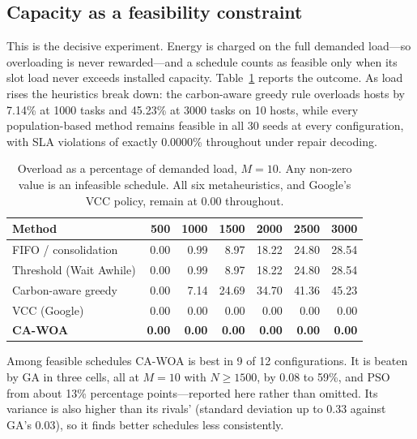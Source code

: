 \documentclass[12pt,a4paper]{article}
\providecommand{\DIFaddtex}[1]{{\protect\color{blue} \sf #1}} %
\providecommand{\DIFdeltex}[1]{{\protect\color{red} \scriptsize #1}} %
\providecommand{\DIFaddbegin}{} %
\providecommand{\DIFaddend}{} %
\providecommand{\DIFdelbegin}{} %
\providecommand{\DIFdelend}{} %
\providecommand{\DIFadd}[1]{\texorpdfstring{\DIFaddtex{#1}}{#1}} %
\providecommand{\DIFdel}[1]{\texorpdfstring{\DIFdeltex{#1}}{}} %
\providecommand{\DIFscaledelfig}{0.5}
\newlength{\DIFdelgraphicswidth} %
\newlength{\DIFdelgraphicsheight} %
\providecommand{\DIFaddincludegraphics}[2][]{{\color{blue}\fbox{\DIFOincludegraphics[#1]{#2}}}} %
\providecommand{\DIFdelincludegraphics}[2][]{%
\sbox{\DIFdelgraphicsbox}{\DIFOincludegraphics[#1]{#2}}%
\settoboxwidth{\DIFdelgraphicswidth}{\DIFdelgraphicsbox} %
\settoboxtotalheight{\DIFdelgraphicsheight}{\DIFdelgraphicsbox} %
\scalebox{\DIFscaledelfig}{%
\parbox[b]{\DIFdelgraphicswidth}{\usebox{\DIFdelgraphicsbox}\\[-\baselineskip] \rule{\DIFdelgraphicswidth}{0em}}\llap{\resizebox{\DIFdelgraphicswidth}{\DIFdelgraphicsheight}{%
\setlength{\unitlength}{\DIFdelgraphicswidth}%
\begin{picture}(1,1)%
\thicklines\linethickness{2pt} %
{\color[rgb]{1,0,0}\put(0,0){\framebox(1,1){}}}%
{\color[rgb]{1,0,0}\put(0,0){\line( 1,1){1}}}%
{\color[rgb]{1,0,0}\put(0,1){\line(1,-1){1}}}%
\end{picture}%
}\hspace*{3pt}}} %
} %
\DeclareRobustCommand{\DIFaddbegin}{\DIFOaddbegin \let\includegraphics\DIFaddincludegraphics} %
\DeclareRobustCommand{\DIFaddend}{\DIFOaddend \let\includegraphics\DIFOincludegraphics} %
\DeclareRobustCommand{\DIFdelbegin}{\DIFOdelbegin \let\includegraphics\DIFdelincludegraphics} %
\DeclareRobustCommand{\DIFdelend}{\DIFOaddend \let\includegraphics\DIFOincludegraphics} %
\begin{document}
\subsection{\DIFadd{Capacity as a feasibility constraint}}\label{sec:feas}
\DIFadd{This is the decisive experiment. Energy is charged on the full demanded load---so overloading is never
rewarded---and a schedule counts as feasible only when its slot load never exceeds installed capacity.
Table~\ref{tab:feas} reports the outcome. As load rises the heuristics break down: the carbon-aware greedy
rule overloads hosts by 7.14\% at 1000 tasks and 45.23\% at 3000 tasks on 10 hosts, while every
population-based method remains feasible in all 30 seeds at every configuration, with SLA violations of
exactly 0.0000\% throughout under repair decoding.
}

\begin{table}[H]\centering\footnotesize
\caption{Overload as a percentage of demanded load, $M=10$. Any non-zero value is an infeasible schedule. All
six metaheuristics, and Google's VCC policy, remain at 0.00 throughout.}\label{tab:feas}
\begin{tabular}{lrrrrrr}
\toprule
Method & 500 & 1000 & 1500 & 2000 & 2500 & 3000 \\ \midrule
FIFO / consolidation      & 0.00 & 0.99 & 8.97  & 18.22 & 24.80 & 28.54 \\
Threshold (Wait Awhile)   & 0.00 & 0.99 & 8.97  & 18.22 & 24.80 & 28.54 \\
Carbon-aware greedy       & 0.00 & 7.14 & 24.69 & 34.70 & 41.36 & 45.23 \\
VCC (Google)              & 0.00 & 0.00 & 0.00  & 0.00  & 0.00  & 0.00 \\
\textbf{CA-WOA}           & \textbf{0.00} & \textbf{0.00} & \textbf{0.00} & \textbf{0.00} & \textbf{0.00} & \textbf{0.00} \\
\bottomrule
\end{tabular}
\end{table}

\DIFadd{Among feasible schedules CA-WOA is best in 9 of 12 configurations. It is beaten by GA in three cells, all at
$M=10$ with $N\ge1500$, by 0.08 }\DIFaddend to \DIFdelbegin \DIFdel{59\%, and PSO from about 13\%}\DIFdelend \DIFaddbegin \DIFadd{0.15 percentage points---reported here rather than omitted. Its variance is
also higher than its rivals' (standard deviation up to 0.33 against GA's 0.03), so it finds better schedules
less consistently.
}
\end{document}
